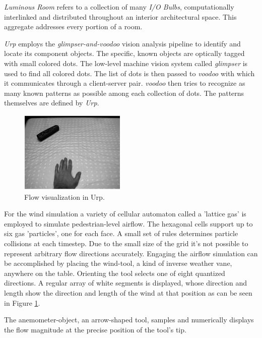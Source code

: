 \textit{Luminous Room} refers to a collection of many \textit{I/O Bulbs}, computationally interlinked and distributed throughout an interior architectural space. This aggregate addresses every portion of a room. 

\textit{Urp} employs the \textit{glimpser-and-voodoo} vision analysis pipeline \cite{underkoffler98} to identify and locate its component objects. The specific, known objects are optically tagged with small colored dots. The low-level machine vision system called \textit{glimpser} is used to find all colored dots. The list of dots is then passed to \textit{voodoo} with which it communicates through a client-server pair. 
\textit{voodoo} then tries to recognize as many known patterns as possible among each collection of dots. 
The patterns themselves are defined by \textit{Urp}. 

\begin{figure}
\centering
\includegraphics[width=0.45\textwidth]{figures/urp-fluid.jpg}
\caption{Flow visualization in Urp.}
\label{fig:urpa}
\end{figure}

For the wind simulation a variety of cellular automaton called a 'lattice gas' is employed to simulate pedestrian-level airflow. The hexagonal cells support up to six gas 'particles', one for each face. 
A small set of rules determines particle collisions at each timestep. Due to the small size of the grid it's not possible to represent arbitrary flow directions accurately. 
Engaging the airflow simulation can be accomplished by placing the wind-tool, a kind of inverse weather vane, anywhere on the table. Orienting the tool selects one of eight quantized directions. A regular array of white segments is displayed, whose direction and length show the direction and length of the wind at that position as can be seen in Figure \ref{fig:urpa}. 

The anemometer-object, an arrow-shaped tool, samples and numerically displays the flow magnitude at the precise position of the tool's tip.

